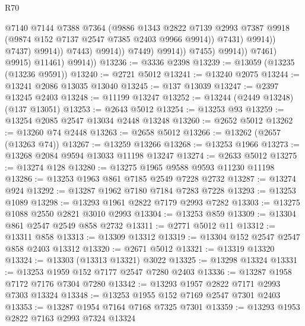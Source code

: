 \begin{lexlean}{R70}
\begin{coremodule}
                                            @7140
                                            @7144
                                            @7388
                                            @7364
                                            (@9886
                                              @1343
                                              @2822
                                              @7139
                                              @2993
                                              @7387
                                              @9918
                                              (@9874 @152 @7137 @2547 @7385 @2403 @9966 @9914))
                                            @7431)
                                          @9914))
                                      @7437)
                                    @9914))
                                @7443)
                              @9914))
                          @7449)
                        @9914))
                    @7455)
                  @9914))
              @7461)
            @9915)
          @11461)
        @9914))
@13236 := @3336 @2398
@13239 := @13059 (@13235 (@13236 @9591))
@13240 := @2721 @5012
@13241 := @13240 @2075
@13244 := @13241 @2086 @13035 @13040
@13245 := @137 @13039
@13247 := @2397 @13245 @2403
@13248 := @11199 @13247
@13252 := @13244 (@2449 @13248) (@137 @13051)
@13253 := @2643 @5012
@13254 := @13253 @93
@13259 := @13254 @2085 @2547 @13034 @2448 @13248
@13260 := @2652 @5012
@13262 := @13260 @74 @2448
@13263 := @2658 @5012
@13266 := @13262 (@2657 (@13263 @74))
@13267 := @13259 @13266
@13268 := @13253 @1966
@13273 := @13268 @2084 @9594 @13033 @11198 @13247
@13274 := @2633 @5012
@13275 := @13274 @128
@13280 := @13275 @1965 @9588 @9593 @11230 @11198
@13286 := @13253 @1963 @861 @7185 @2549 @7228 @2732
@13287 := @13274 @924
@13292 := @13287 @1962 @7180 @7184 @7283 @7228
@13293 := @13253 @1089
@13298 := @13293 @1961 @2822 @7179 @2993 @7282
@13303 := @13275 @1088 @2550 @2821 @3010 @2993
@13304 := @13253 @859
@13309 := @13304 @861 @2547 @2549 @858 @2732
@13311 := @2771 @5012 @11
@13312 := @13311 @858
@13313 := @13309 @13312
@13319 := @13304 @152 @2547 @2547 @858 @2403 @13312
@13320 := @2671 @5012
@13321 := @13319 @13320
@13324 := @13303 (@13313 @13321) @3022
@13325 := @13298 @13324
@13331 := @13253 @1959 @152 @7177 @2547 @7280 @2403
@13336 := @13287 @1958 @7172 @7176 @7304 @7280
@13342 := @13293 @1957 @2822 @7171 @2993 @7303 @13324
@13348 := @13253 @1955 @152 @7169 @2547 @7301 @2403
@13353 := @13287 @1954 @7164 @7168 @7325 @7301
@13359 := @13293 @1953 @2822 @7163 @2993 @7324 @13324

\end{coremodule}
\end{lexlean}
